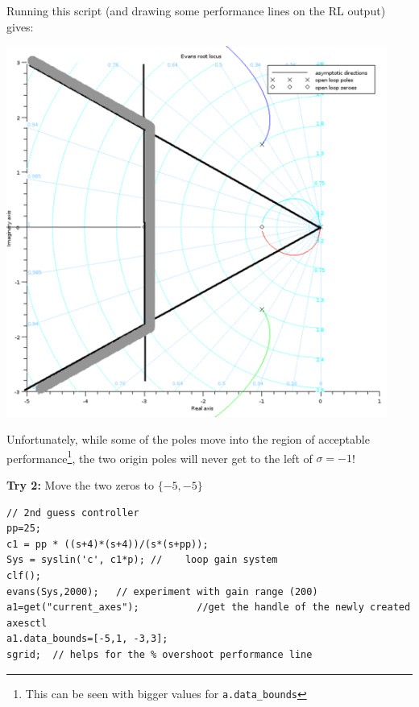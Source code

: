 \begin{ExampleCont}
Running this script (and drawing some performance lines on the RL output) gives:

\includegraphics[width=125mm]{figs11/des_examp_01a.png}

Unfortunately, while some of the poles move into the region of acceptable performance\footnote{This can be seen with bigger values for {\tt a.data\_bounds}},
the two origin poles will never get to the left of $\sigma = -1$!

\vspace{0.2in}
{\bf Try 2: } Move the two zeros to $\{-5,-5\}$
\begin{verbatim}
// 2nd guess controller
pp=25;
c1 = pp * ((s+4)*(s+4))/(s*(s+pp));
Sys = syslin('c', c1*p); //    loop gain system
clf();
evans(Sys,2000);   // experiment with gain range (200)
a1=get("current_axes");          //get the handle of the newly created axesctl
a1.data_bounds=[-5,1, -3,3];
sgrid;  // helps for the % overshoot performance line
\end{verbatim}

\end{ExampleCont}

